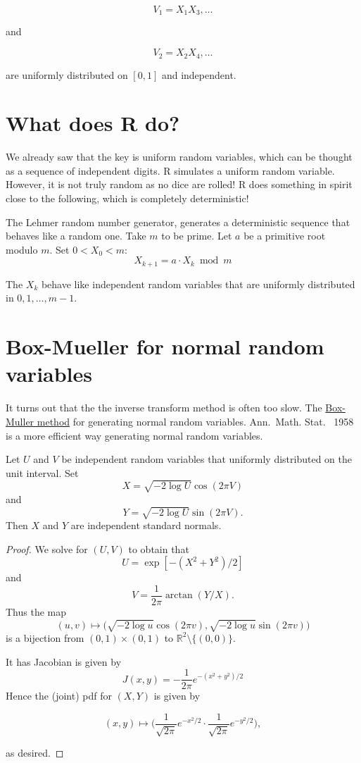 \documentclass[
]{article}
\theoremstyle{definition}
\theoremstyle{definition}
\theoremstyle{definition}
\theoremstyle{definition}
\theoremstyle{remark}
\begin{document}
\[V_1 = X_1 X_3, \ldots\]

and

\[V_2 = X_2 X_4, \ldots\]

are uniformly distributed on \([0,1]\) and independent.

\hypertarget{what-does-r-do}{%
\section{What does R do?}\label{what-does-r-do}}

We already saw that the key is uniform random variables, which can be thought as a sequence of independent digits. R simulates a uniform random variable. However, it is not truly random as no dice are rolled! R does something in spirit close to the following, which is completely deterministic!

The Lehmer random number generator, generates a deterministic sequence that behaves like a random one. Take \(m\) to be prime. Let \(a\) be a primitive root modulo \(m\). Set \(0 < X_0 < m\):\\
\[X_{k+1} = a \cdot X_k \bmod m\]

The \(X_k\) behave like independent random variables that are uniformly distributed in \(0, 1, \ldots, m-1\).

\hypertarget{box-mueller-for-normal-random-variables}{%
\section{Box-Mueller for normal random variables}\label{box-mueller-for-normal-random-variables}}

It turns out that the the inverse transform method is often too slow. The \href{https://projecteuclid.org/journals/annals-of-mathematical-statistics/volume-29/issue-2/A-Note-on-the-Generation-of-Random-Normal-Deviates/10.1214/aoms/1177706645.full}{Box-Muller method} for generating normal random variables. Ann.~Math. Stat.~ 1958 is a more efficient way generating normal random variables.

Let \(U\) and \(V\) be independent random variables that uniformly distributed on the unit interval. Set
\[X = \sqrt{ -2 \log U} \cos (2 \pi V)\]
and
\[Y =     \sqrt{ -2 \log U} \sin (2 \pi V).\]
Then \(X\) and \(Y\) are independent standard normals.

\begin{proof}
We solve for \((U,V)\) to obtain that
\[U = \exp[  -(X^2 + Y^2)/2]\]
and
\[V =  \frac{1}{2\pi} \arctan(Y /X).\]
Thus the map \[(u, v) \mapsto  \big (\sqrt{ -2 \log u} \cos (2 \pi v),  \sqrt{ -2 \log u} \sin (2 \pi v)  \big)\]
is a bijection from \((0,1) \times (0,1)\) to \(\mathbb{R}^2 \setminus \{ (0,0)\}.\)

It has Jacobian is given by
\[J(x,y) = -\frac{1}{2\pi } e^{-(x^2 + y^2)/2}\]
Hence the (joint) pdf for \((X,Y)\) is given by

\[(x,y) \mapsto  \Big( \frac{1}{\sqrt{2 \pi} } e^{-x^2/2}  \cdot    \frac{1}{\sqrt{2 \pi}}  e^{-y^2/2} \Big),\]

as desired.
\end{proof}
\end{document}

